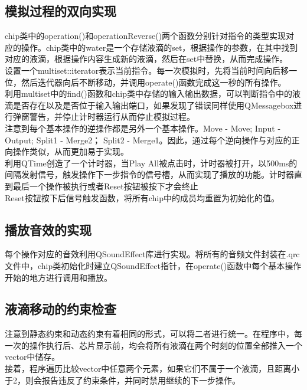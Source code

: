 \documentclass[12pt, a4paper]{article}
\begin{document}
		\subsection{模拟过程的双向实现}
			chip类中的operation()和operationReverse()两个函数分别针对指令的类型实现对应的操作。chip类中的water是一个存储液滴的set，根据操作的参数，在其中找到对应的液滴，根据操作内容生成新的液滴，然后在set中替换，从而完成操作。\\ \hspace*{0.8cm}
			设置一个multiset::iterator表示当前指令。每一次模拟时，先将当前时间向后移一位，然后迭代器向后不断移动，并调用operate()函数完成这一秒的所有操作。 \\ \hspace*{0.8cm}
			利用multiset中的find()函数和chip类中存储的输入输出数据，可以判断指令中的液滴是否存在以及是否位于输入输出端口，如果发现了错误同样使用QMessagebox进行弹窗警告，并停止计时器运行从而停止模拟过程。\\ \hspace*{0.8cm}
			注意到每个基本操作的逆操作都是另外一个基本操作。Move - Move; Input - Output; Split1 - Merge2； Split2 - Merge1。因此，通过每个逆向操作与对应的正向操作类似，从而更加易于实现。\\ \hspace*{0.8cm}
			利用QTime创造了一个计时器，当Play All被点击时，计时器被打开，以500ms的间隔发射信号，触发操作下一步指令的信号槽，从而实现了播放的功能。计时器直到最后一个操作被执行或者Reset按钮被按下才会终止 \\ \hspace*{0.8cm}
			Reset按钮按下后信号触发函数，将所有chip中的成员均重置为初始化的值。
		\subsection{播放音效的实现}
			每个操作对应的音效利用QSoundEffect库进行实现。将所有的音频文件封装在.qrc文件中，chip类初始化时建立QSoundEffect指针，在operate()函数中每个基本操作开始的地方进行调用和播放。
		\subsection{液滴移动的约束检查}
			注意到静态约束和动态约束有着相同的形式，可以将二者进行统一。在程序中，每一次的操作执行后、芯片显示前，均会将所有液滴在两个时刻的位置全部推入一个vector中储存。\\ \hspace*{0.8cm}
			接着，程序遍历比较vector中任意两个元素，如果它们不属于一个液滴，且距离小于2，则会报告违反了约束条件，并同时禁用继续的下一步操作。
\end{document}
